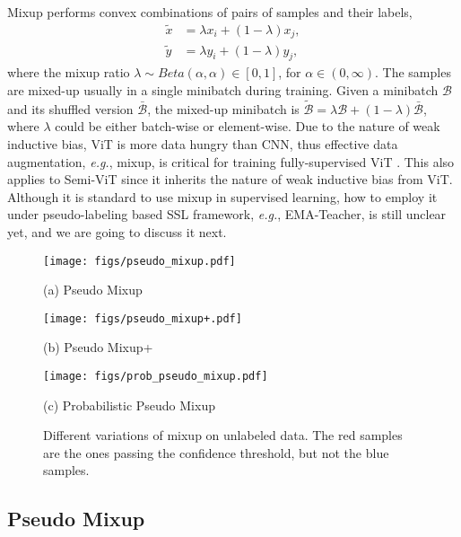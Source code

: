 \documentclass{article}
\newcommand\eg{\emph{e.g.}}
\begin{document}
Mixup \cite{DBLP:conf/iclr/ZhangCDL18} performs convex combinations of pairs of samples and their labels,
\begin{equation}
\begin{aligned}
    \tilde{x}&=\lambda x_i + (1-\lambda)x_j, \\
    \tilde{y}&=\lambda y_i + (1-\lambda)y_j,
\end{aligned}
\end{equation}
where the mixup ratio $\lambda\sim{Beta}(\alpha,\alpha)\in{[0,1]}$, for $\alpha\in(0,\infty)$. The samples are mixed-up usually in a single minibatch during training. Given a minibatch $\mathcal{B}$ and its shuffled version $\bar{\mathcal{B}}$, the mixed-up minibatch is $\tilde{\mathcal{B}}=\lambda\mathcal{B}+(1-\lambda)\bar{\mathcal{B}}$, where $\lambda$ could be either batch-wise or element-wise. Due to the nature of weak inductive bias, ViT is more data hungry than CNN, thus effective data augmentation, \eg, mixup, is critical for training fully-supervised ViT \cite{DBLP:conf/iclr/DosovitskiyB0WZ21,DBLP:conf/icml/TouvronCDMSJ21,DBLP:conf/iccv/LiuL00W0LG21,DBLP:conf/iccv/XuXCT21}. This also applies to Semi-ViT since it inherits the nature of weak inductive bias from ViT. Although it is standard to use mixup in supervised learning, how to employ it under pseudo-labeling based SSL framework, \eg, EMA-Teacher, is still unclear yet, and we are going to discuss it next.

\begin{figure*}[t!]
\begin{minipage}[b]{.32\linewidth}
\centering
\centerline{\texttt{[image: figs/pseudo\_mixup.pdf]}}{(a) Pseudo Mixup}
\end{minipage}
\hfill
\begin{minipage}[b]{.32\linewidth}
\centering
\centerline{\texttt{[image: figs/pseudo\_mixup+.pdf]}}{(b) Pseudo Mixup+}
\end{minipage}
\hfill
\begin{minipage}[b]{.32\linewidth}
\centering
\centerline{\texttt{[image: figs/prob\_pseudo\_mixup.pdf]}}{(c) Probabilistic Pseudo Mixup}
\end{minipage}
\caption{Different variations of mixup on unlabeled data. The red samples are the ones passing the confidence threshold, but not the blue samples.}
\label{fig:mixup}
\end{figure*}

\subsection{Pseudo Mixup}
\label{subse:pseudo mixup}
\end{document}
